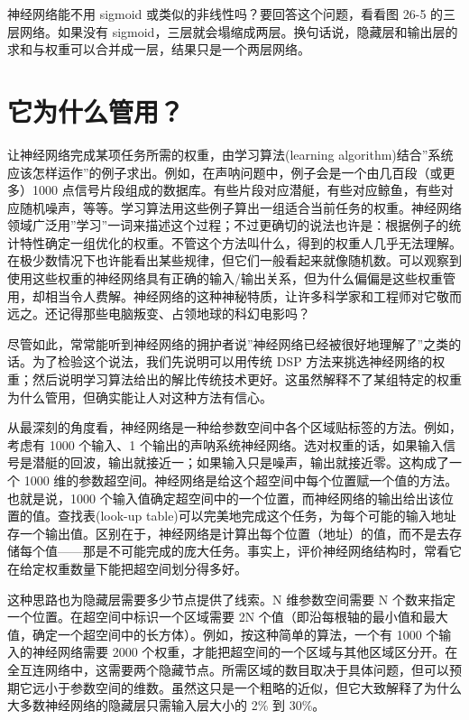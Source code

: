 神经网络能不用 sigmoid 或类似的非线性吗？要回答这个问题，看看图 26-5
的三层网络。如果没有
sigmoid，三层就会塌缩成两层。换句话说，隐藏层和输出层的求和与权重可以合并成一层，结果只是一个两层网络。

\section{它为什么管用？}

让神经网络完成某项任务所需的权重，由学习算法(learning
algorithm)结合''系统应该怎样运作''的例子求出。例如，在声呐问题中，例子会是一个由几百段（或更多）1000
点信号片段组成的数据库。有些片段对应潜艇，有些对应鲸鱼，有些对应随机噪声，等等。学习算法用这些例子算出一组适合当前任务的权重。神经网络领域广泛用''学习''一词来描述这个过程；不过更确切的说法也许是：根据例子的统计特性确定一组优化的权重。不管这个方法叫什么，得到的权重人几乎无法理解。在极少数情况下也许能看出某些规律，但它们一般看起来就像随机数。可以观察到使用这些权重的神经网络具有正确的输入/输出关系，但为什么偏偏是这些权重管用，却相当令人费解。神经网络的这种神秘特质，让许多科学家和工程师对它敬而远之。还记得那些电脑叛变、占领地球的科幻电影吗？

尽管如此，常常能听到神经网络的拥护者说''神经网络已经被很好地理解了''之类的话。为了检验这个说法，我们先说明可以用传统
DSP
方法来挑选神经网络的权重；然后说明学习算法给出的解比传统技术更好。这虽然解释不了某组特定的权重为什么管用，但确实能让人对这种方法有信心。

从最深刻的角度看，神经网络是一种给参数空间中各个区域贴标签的方法。例如，考虑有
1000 个输入、1
个输出的声呐系统神经网络。选对权重的话，如果输入信号是潜艇的回波，输出就接近一；如果输入只是噪声，输出就接近零。这构成了一个
1000
维的参数超空间。神经网络是给这个超空间中每个位置赋一个值的方法。也就是说，1000
个输入值确定超空间中的一个位置，而神经网络的输出给出该位置的值。查找表(look-up
table)可以完美地完成这个任务，为每个可能的输入地址存一个输出值。区别在于，神经网络是计算出每个位置（地址）的值，而不是去存储每个值------那是不可能完成的庞大任务。事实上，评价神经网络结构时，常看它在给定权重数量下能把超空间划分得多好。

这种思路也为隐藏层需要多少节点提供了线索。N 维参数空间需要 N
个数来指定一个位置。在超空间中标识一个区域需要 2N
个值（即沿每根轴的最小值和最大值，确定一个超空间中的长方体）。例如，按这种简单的算法，一个有
1000 个输入的神经网络需要 2000
个权重，才能把超空间的一个区域与其他区域区分开。在全互连网络中，这需要两个隐藏节点。所需区域的数目取决于具体问题，但可以预期它远小于参数空间的维数。虽然这只是一个粗略的近似，但它大致解释了为什么大多数神经网络的隐藏层只需输入层大小的
2\% 到 30\%。

